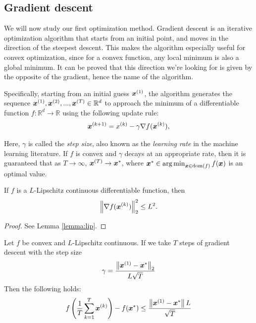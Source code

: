 \documentclass{article}
\DeclareMathOperator*{\argmin}{\arg\min}
\newcommand{\R}{\mathbb{R}}
\begin{document}
\subsection{Gradient descent}

We will now study our first optimization method.
Gradient descent is an iterative optimization algorithm that starts from an initial point, and moves in the direction of the steepest descent. 
This makes the algorithm especially useful for convex optimization, since for a convex function, any local minimum is also a global minimum. 
It can be proved that this direction we're looking for is given by the opposite of the gradient, hence the name of the algorithm.

Specifically, starting from an initial guess ${\bm{x}}^{(1)}$, the algorithm generates the sequence ${\bm{x}}^{(1)}, {\bm{x}}^{(2)}, ..., {\bm{x}}^{(T)} \in \mathbb{R}^d$ to approach the minimum of a differentiable function $f:\R^d\to\R$ using the following update rule:
\[
    {\bm{x}}^{(k+1)} = x^{(k)} - \gamma \nabla f({\bm{x}}^{(k)}),
\]

Here, $\gamma$ is called the \emph{step size}, also known as the \emph{learning rate} in the machine learning literature. If $f$ is convex and $\gamma$ decays at an appropriate rate, then it is guaranteed that as $T \to \infty$, ${\bm{x}}^{(T)} \to {\bm{x}}^\ast$, where $\vx^\ast \in \argmin_{\vx\in\dom(f)} f(\vx)$ is an optimal value.

\begin{lemma}
If $f$ is a $L$-Lipschitz continuous differentiable function, then
\[
\left\|\nabla f({\bm{x}}^{(k)})\right\|_2^2 \leq L^2.
\]
\label{lemma:lipschitz}
\end{lemma}
\begin{proof}
See Lemma \ref{lemma:lip}.
\end{proof}
\begin{thm}
Let $f$ be convex and $L$-Lipschitz continuous\footnotemark[6]. If we take $T$ steps of gradient descent with the step size
\[
\gamma = \frac{\left\|{{\bm{x}}}^{(1)} - {{\bm{x}}}^\ast\right\|_2}{L \sqrt{T}}
\]
Then the following holds:
\[
f\left(\frac{1}{T}\sum_{k=1}^T {{\bm{x}}}^{(k)}\right) - f({{\bm{x}}}^\ast) \leq \frac{\left\|{{\bm{x}}}^{(1)} - {{\bm{x}}}^\ast\right\|L}{\sqrt{T}}
\]
\end{thm}
\end{document}
